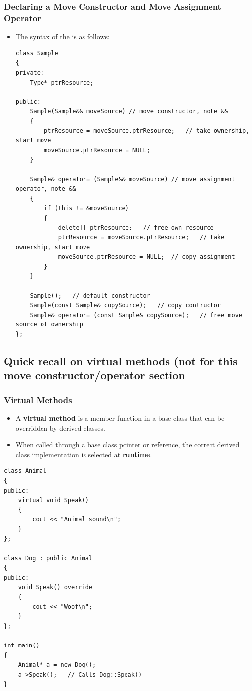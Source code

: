 \documentclass[10pt]{article}
\begin{document}
\newpage

\subsubsection{Declaring a Move Constructor and Move Assignment Operator}
\begin{itemize}
	\item The syntax of the  is as follows:

		\begin{verbatim}
class Sample
{
private:
	Type* ptrResource;

public:
	Sample(Sample&& moveSource)	// move constructor, note &&
	{
		ptrResource = moveSource.ptrResource;	// take ownership, start move
		moveSource.ptrResource = NULL;
	}

	Sample& operator= (Sample&& moveSource)	// move assignment operator, note &&
	{
		if (this != &moveSource)
		{
			delete[] ptrResource;	// free own resource
			ptrResource = moveSource.ptrResource;	// take ownership, start move
			moveSource.ptrResource = NULL;	// copy assignment
		}
	}

	Sample();	// default constructor
	Sample(const Sample& copySource);	// copy contructor
	Sample& operator= (const Sample& copySource);	// free move source of ownership
};
		\end{verbatim}
\end{itemize}

\newpage

\subsection*{Quick recall on virtual methods (not for this move constructor/operator section}

\subsubsection*{Virtual Methods}
\begin{itemize}
    \item A \textbf{virtual method} is a member function in a base class that can be overridden by derived classes.

    \item When called through a base class pointer or reference, the correct derived class implementation is selected at \textbf{runtime}.
\end{itemize}

\begin{verbatim}
class Animal
{
public:
    virtual void Speak()
    {
        cout << "Animal sound\n";
    }
};

class Dog : public Animal
{
public:
    void Speak() override
    {
        cout << "Woof\n";
    }
};

int main()
{
    Animal* a = new Dog();
    a->Speak();   // Calls Dog::Speak()
}
\end{verbatim}
\end{document}
